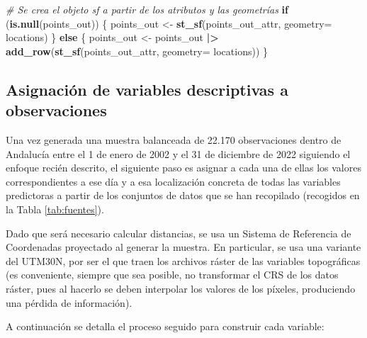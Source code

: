 \documentclass[12pt,a4paper,]{book}
\newenvironment{Shaded}{\begin{snugshade}}{\end{snugshade}}
\newcommand{\AttributeTok}[1]{\textcolor[rgb]{0.13,0.29,0.53}{#1}}
\newcommand{\CommentTok}[1]{\textcolor[rgb]{0.56,0.35,0.01}{\textit{#1}}}
\newcommand{\ControlFlowTok}[1]{\textcolor[rgb]{0.13,0.29,0.53}{\textbf{#1}}}
\newcommand{\FunctionTok}[1]{\textcolor[rgb]{0.13,0.29,0.53}{\textbf{#1}}}
\newcommand{\NormalTok}[1]{#1}
\newcommand{\OtherTok}[1]{\textcolor[rgb]{0.56,0.35,0.01}{#1}}
\newcommand{\SpecialCharTok}[1]{\textcolor[rgb]{0.81,0.36,0.00}{\textbf{#1}}}
\numberwithin{dummy}{section}
\theoremstyle{ocrenumbox}
\theoremstyle{blacknumex}
\theoremstyle{blacknumbox}
\theoremstyle{ocrenum}
\theoremstyle{ocrenum}
\begin{document}
\begin{Shaded}
\begin{Highlighting}[]
\CommentTok{\# Se crea el objeto sf a partir de los atributos y las geometrías}
\ControlFlowTok{if}\NormalTok{ (}\FunctionTok{is.null}\NormalTok{(points\_out)) \{}
\NormalTok{  points\_out }\OtherTok{\textless{}{-}} \FunctionTok{st\_sf}\NormalTok{(points\_out\_attr,}
                      \AttributeTok{geometry=}\NormalTok{ locations)}
\NormalTok{\} }\ControlFlowTok{else}\NormalTok{ \{}
\NormalTok{  points\_out }\OtherTok{\textless{}{-}}\NormalTok{ points\_out }\SpecialCharTok{|\textgreater{}} 
    \FunctionTok{add\_row}\NormalTok{(}\FunctionTok{st\_sf}\NormalTok{(points\_out\_attr,}
                  \AttributeTok{geometry=}\NormalTok{ locations)) }
\NormalTok{\}}
\end{Highlighting}
\end{Shaded}

\hypertarget{asignaciuxf3n-de-variables-descriptivas-a-observaciones}{%
\subsection{Asignación de variables descriptivas a
observaciones}\label{asignaciuxf3n-de-variables-descriptivas-a-observaciones}}

Una vez generada una muestra balanceada de 22.170 observaciones dentro
de Andalucía entre el 1 de enero de 2002 y el 31 de diciembre de 2022
siguiendo el enfoque recién descrito, el siguiente paso es asignar a
cada una de ellas los valores correspondientes a ese día y a esa
localización concreta de todas las variables predictoras a partir de los
conjuntos de datos que se han recopilado (recogidos en la Tabla
\ref{tab:fuentes}).

Dado que será necesario calcular distancias, se usa un Sistema de
Referencia de Coordenadas proyectado al generar la muestra. En
particular, se usa una variante del UTM30N, por ser el que traen los
archivos ráster de las variables topográficas (es conveniente, siempre
que sea posible, no transformar el CRS de los datos ráster, pues al
hacerlo se deben interpolar los valores de los píxeles, produciendo una
pérdida de información).

A continuación se detalla el proceso seguido para construir cada
variable:
\end{document}
